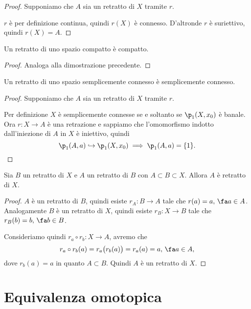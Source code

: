 \begin{proof}
	Supponiamo che \(A\) sia un retratto di \(X\) tramite \(r\).

	\(r\) è per definizione continua, quindi \(r(X)\) è connesso.
	D'altronde \(r\) è suriettivo, quindi \(r(X)=A\).
\end{proof}

\begin{pr}
	Un retratto di uno spazio compatto è compatto.
\end{pr}

\begin{proof}
	Analoga alla dimostrazione precedente.
\end{proof}

\begin{pr}
	Un retratto di uno spazio semplicemente connesso è semplicemente connesso.
\end{pr}

\begin{proof}
	Supponiamo che \(A\) sia un retratto di \(X\) tramite \(r\).

	Per definizione \(X\) è semplicemente connesse se e soltanto se \(\p_1(X,x_0)\) è banale.
	Ora \(r\colon X \to A\) è una retrazione e sappiamo che l'omomorfismo indotto dall'iniezione di \(A\) in \(X\) è iniettivo, quindi
	\[
		\p_1(A,a) \hookrightarrow \p_1(X,x_0) \implies \p_1(A,a) = \{1\}.
	\]
\end{proof}

\begin{pr}
	Sia \(B\) un retratto di \(X\) e \(A\) un retratto di \(B\) con \(A\subset B \subset X\).
	Allora \(A\) è retratto di \(X\).
\end{pr}

\begin{proof}
	\(A\) è un retratto di \(B\), quindi esiste \(r_A\colon B \to A\) tale che \(r(a)=a,\,\fa a \in A\).
	Analogamente \(B\) è un retratto di \(X\), quindi esiste \(r_B \colon X \to B\) tale che \(r_B(b)=b,\,\fa b\in B\).

	Consideriamo quindi \(r_a \circ r_b\colon X \to A\), avremo che
	\[
		r_a \circ r_b(a) = r_a\big(r_b(a)\big) = r_a(a) = a,\,\fa a \in A,
	\]
	dove \(r_b(a)=a\) in quanto \(A\subset B\).
	Quindi \(A\) è un retratto di \(X\).
\end{proof}
\section{Equivalenza omotopica}

